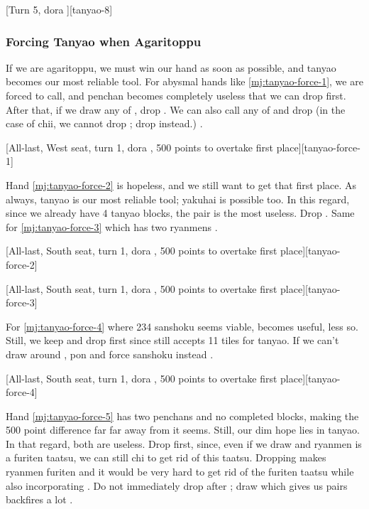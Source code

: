 \documentclass[12pt]{article}
\begin{document}
[Turn 5, dora ][tanyao-8]


\subsubsection*{Forcing Tanyao when Agaritoppu}

If we are agaritoppu, we must win our hand as soon as possible, and tanyao becomes our most reliable tool. For abysmal hands like \ref{mj:tanyao-force-1}, we are forced to call, and  penchan becomes completely useless that we can drop  first. After that, if we draw any of , drop . We can also call any of  and drop  (in the case of  chii, we cannot drop ; drop  instead.) \citep[][pp.~11--12]{kawamura-naki}.

[All-last, West seat, turn 1, dora , 500 points to overtake first place][tanyao-force-1]

Hand \ref{mj:tanyao-force-2} is hopeless, and we still want to get that first place. As always, tanyao is our most reliable tool; yakuhai is possible too. In this regard, since we already have 4 tanyao blocks, the  pair is the most useless. Drop . Same for \ref{mj:tanyao-force-3} which has two ryanmens \citep[][pp.~27--30]{kawamura-naki}.

[All-last, South seat, turn 1, dora , 500 points to overtake first place][tanyao-force-2]

[All-last, South seat, turn 1, dora , 500 points to overtake first place][tanyao-force-3]

For \ref{mj:tanyao-force-4} where 234 sanshoku seems viable,  becomes useful,  less so. Still, we keep  and drop  first since  still accepts  11 tiles for tanyao. If we can't draw around , pon  and force sanshoku instead \citep[][pp.~29--30]{kawamura-naki}.

[All-last, South seat, turn 1, dora , 500 points to overtake first place][tanyao-force-4]

Hand \ref{mj:tanyao-force-5} has two penchans and no completed blocks, making the 500 point difference far far away from it seems. Still, our dim hope lies in tanyao. In that regard, both  are useless. Drop  first, since, even if we draw  and  ryanmen is a furiten taatsu, we can still chi  to get rid of this taatsu. Dropping  makes  ryanmen furiten and it would be very hard to get rid of the furiten taatsu while also incorporating . Do not immediately drop  after ;  draw which gives us pairs backfires a lot \citep[][pp.~53--54]{kawamura-naki}.
\end{document}
